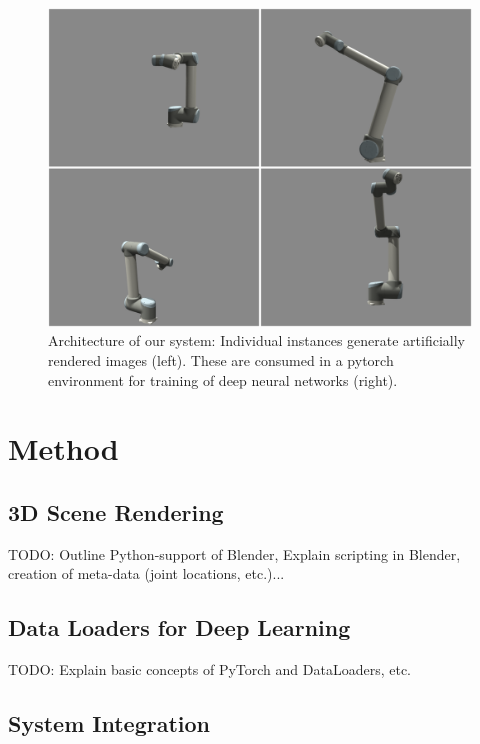 \documentclass[conference]{IEEEtran}
\begin{document}
\begin{figure}[htbp]
\centerline{\includegraphics[width=\columnwidth]{figures/examplesUR10/renderedImages.png}}
\caption{\label{fig:architecture} Architecture of our system: Individual instances generate artificially rendered images (left). These are consumed in a pytorch environment for training of deep neural networks (right).}
\label{fig}
\end{figure}


\section{Method}

\subsection{3D Scene Rendering}

TODO: Outline Python-support of Blender, Explain scripting in Blender, creation of meta-data (joint locations, etc.)...

\subsection{Data Loaders for Deep Learning}

TODO: Explain basic concepts of PyTorch and DataLoaders, etc.

\subsection{System Integration}
\end{document}
